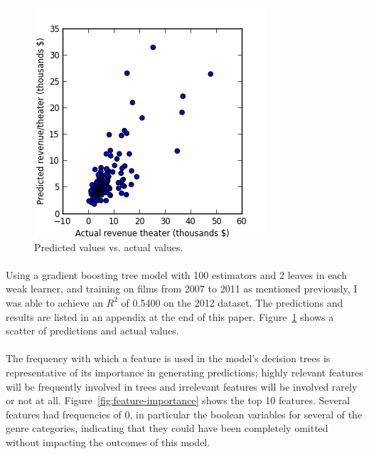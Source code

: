 \documentclass[10pt]{article}
\begin{document}
    \begin{figure}[ht]
        \centering
        \includegraphics{pred_actual.png}
        \caption{Predicted values vs. actual values.}
        \label{fig:pred-actual}
    \end{figure}
    
    \paragraph{}
    Using a gradient boosting tree model with 100 estimators and 2 leaves in each weak learner, and training on films from 2007 to 2011 as mentioned previously, I was able to achieve an $R^2$ of 0.5400 on the 2012 dataset. The predictions and results are listed in an appendix at the end of this paper. Figure~\ref{fig:pred-actual} shows a scatter of predictions and actual values. 
    
    \paragraph{}
    The frequency with which a feature is used in the model's decision trees is representative of its importance in generating predictions; highly relevant features will be frequently involved in trees and irrelevant features will be involved rarely or not at all. Figure~\ref{fig:feature-importance} shows the top 10 features. Several features had frequencies of 0, in particular the boolean variables for several of the genre categories, indicating that they could have been completely omitted without impacting the outcomes of this model. 
    
\end{document}
